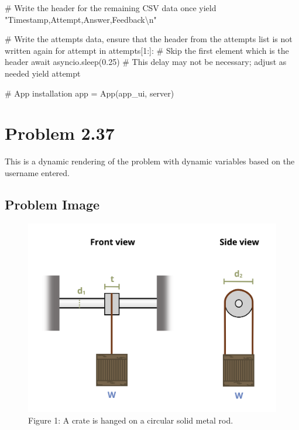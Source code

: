 \documentclass[
  letterpaper,
  DIV=11,
  numbers=noendperiod]{scrreprt}
\newenvironment{Shaded}{\begin{snugshade}}{\end{snugshade}}
\newcommand{\NormalTok}[1]{\textcolor[rgb]{0.00,0.23,0.31}{#1}}
\begin{document}
\begin{Shaded}
\begin{Highlighting}[]
\NormalTok{        \# Write the header for the remaining CSV data once}
\NormalTok{        yield "Timestamp,Attempt,Answer,Feedback\textbackslash{}n"}
        
\NormalTok{        \# Write the attempts data, ensure that the header from the attempts list is not written again}
\NormalTok{        for attempt in attempts[1:]:  \# Skip the first element which is the header}
\NormalTok{            await asyncio.sleep(0.25)  \# This delay may not be necessary; adjust as needed}
\NormalTok{            yield attempt}


\NormalTok{\# App installation}
\NormalTok{app = App(app\_ui, server)}
\end{Highlighting}
\end{Shaded}

\chapter*{Problem 2.37}\label{problem-2.37}


This is a dynamic rendering of the problem with dynamic variables based
on the username entered.

\section*{Problem Image}\label{problem-image-9}


\begin{figure}[H]

{\centering \includegraphics{images/166.png}

}

\caption{Figure 1: A crate is hanged on a circular solid metal rod.}

\end{figure}%
\end{document}
